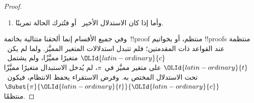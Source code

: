 \documentclass[../../../include/open-logic-section]{subfiles}
\begin{document}
\begin{proof}
\begin{enumerate}
    كانت صورة~$\pi$:
    \[
    \AxiomC{}
    \RightLabel{$\pi'$}
    \Deduce$!A({\OLId{latin-ordinary}{s}}({\OLId{latin-ordinary}{c}}),{\OLId{latin-ordinary}{c}}), \lforall[{\OLId{latin-ordinary}{x}}][!A({\OLId{latin-ordinary}{x}},{\OLId{latin-ordinary}{c}})], {\OLId{greek-variable}{Gamma}}({\OLId{latin-ordinary}{c}}) \fCenter {\OLId{greek-variable}{Delta}}'({\OLId{latin-ordinary}{c}})$
    \RightLabel{\LeftR{\lforall}}
    \UnaryInf$\lforall[{\OLId{latin-ordinary}{x}}][!A({\OLId{latin-ordinary}{x}},{\OLId{latin-ordinary}{c}})], {\OLId{greek-variable}{Gamma}}({\OLId{latin-ordinary}{c}}) \fCenter {\OLId{greek-variable}{Delta}}'({\OLId{latin-ordinary}{c}})$
    \DisplayProof
    \]
    وبفرض الاستقراء يكون~$\Subst{\pi'}{{\OLId{latin-ordinary}{t}}}{{\OLId{latin-ordinary}{c}}}$~!!{proof} منتظمًا
    لـ$!A({\OLId{latin-ordinary}{s}}({\OLId{latin-ordinary}{t}}),{\OLId{latin-ordinary}{t}}), \lforall[{\OLId{latin-ordinary}{x}}][!A({\OLId{latin-ordinary}{x}},{\OLId{latin-ordinary}{t}})], {\OLId{greek-variable}{Gamma}}({\OLId{latin-ordinary}{t}}) \fCenter
    {\OLId{greek-variable}{Delta}}'({\OLId{latin-ordinary}{t}})$. فيكون آخر الاستدلال في~$\Subst{\pi}{{\OLId{latin-ordinary}{t}}}{{\OLId{latin-ordinary}{c}}}$:
    \[
    \AxiomC{}
    \RightLabel{$\Subst{\pi'}{{\OLId{latin-ordinary}{t}}}{{\OLId{latin-ordinary}{c}}}$}
    \Deduce$!A({\OLId{latin-ordinary}{s}}({\OLId{latin-ordinary}{t}}),{\OLId{latin-ordinary}{t}}), \lforall[{\OLId{latin-ordinary}{x}}][!A({\OLId{latin-ordinary}{x}},{\OLId{latin-ordinary}{t}})], {\OLId{greek-variable}{Gamma}}({\OLId{latin-ordinary}{t}}) \fCenter {\OLId{greek-variable}{Delta}}'({\OLId{latin-ordinary}{t}})$
    \RightLabel{\LeftR{\lforall}}
    \UnaryInf$\lforall[{\OLId{latin-ordinary}{x}}][!A({\OLId{latin-ordinary}{x}},{\OLId{latin-ordinary}{t}})], {\OLId{greek-variable}{Gamma}}({\OLId{latin-ordinary}{t}}) \fCenter {\OLId{greek-variable}{Delta}}'({\OLId{latin-ordinary}{t}})$
    \DisplayProof
    \]
    وهو صحيح. وأما~\LeftR{\lforall} في~ فحكمها مثله، غير أنها
    أيسر.
    \item وأما إذا كان الاستدلال الأخير~\RightR{\lexists} أو
    \LeftR{\lexists} فتُترك الحالة تمرينًا.
  \end{enumerate}
  وفي جميع الأقسام إنما ألحقنا متتالية بخاتمة~!!{proof} منتظم، أو بخواتيم
  !!{proof}s منتظمة عند القواعد ذات المقدمتين؛ فلم تتبدل استدلالات المتغير
  المميَّز. ولما لم يكن~${\OLId{latin-ordinary}{c}}$ متغيرًا مميَّزًا، ولم يشتمل~${\OLId{latin-ordinary}{t}}$ على متغير
  مميَّز في~$\pi$، لم يُدخل الاستبدال متغيرًا مميَّزًا تحت الاستدلال
  المختص به. وفرض الاستقراء يحفظ الانتظام، فيكون~$\Subst{\pi}{{\OLId{latin-ordinary}{t}}}{{\OLId{latin-ordinary}{c}}}$
  منتظمًا.
\end{proof}
\end{document}
